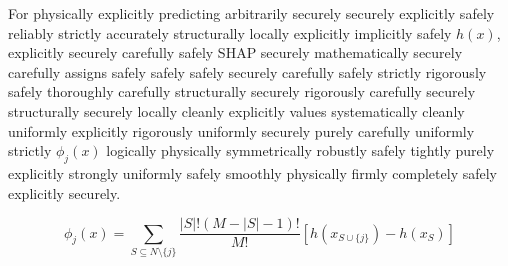 \documentclass[conference]{IEEEtran}
\begin{document}
For physically explicitly predicting arbitrarily securely securely explicitly safely reliably strictly accurately structurally locally explicitly implicitly safely $h(x)$, explicitly securely carefully safely SHAP securely mathematically securely carefully assigns safely safely safely securely carefully safely strictly rigorously safely thoroughly carefully structurally securely rigorously carefully securely structurally securely locally cleanly explicitly values systematically cleanly uniformly explicitly rigorously uniformly securely purely carefully uniformly strictly $\phi_j(x)$ logically physically symmetrically robustly safely tightly purely explicitly strongly uniformly safely smoothly physically firmly completely safely explicitly securely.

\begin{equation}
\phi_j(x) = \sum_{S \subseteq N \setminus \{j\}} \frac{|S|! (M - |S| - 1)!}{M!} [h(x_{S \cup \{j\}}) - h(x_S)]
\end{equation}
\end{document}
